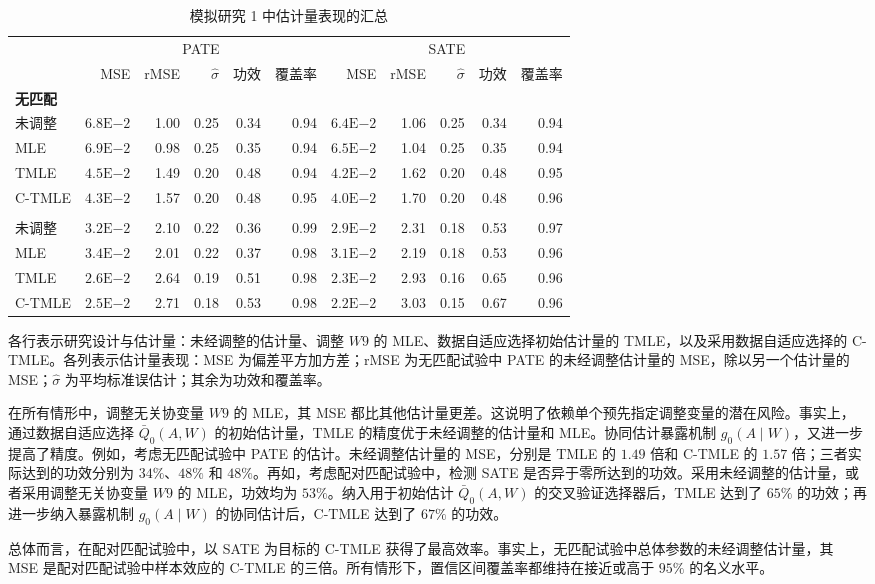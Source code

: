 \begin{table}[htbp]
 \centering
 \caption{模拟研究 1 中估计量表现的汇总}
 \label{tab:ch13-study1}
 \begingroup
 \small
 \setlength{\tabcolsep}{3pt}
 \renewcommand{\arraystretch}{1.16}
 \begin{tabular}{lrrrrrrrrrr}
  \toprule
  &\multicolumn{5}{c}{PATE}&\multicolumn{5}{c}{SATE}\\
  \cmidrule(lr){2-6}\cmidrule(lr){7-11}
  &MSE&rMSE&$\hat\sigma$&功效&覆盖率&MSE&rMSE&$\hat\sigma$&功效&覆盖率\\
  \midrule
  \multicolumn{11}{l}{\textbf{无匹配}}\\
  未调整&$6.8\mathrm E{-2}$&1.00&0.25&0.34&0.94&$6.4\mathrm E{-2}$&1.06&0.25&0.34&0.94\\
  MLE&$6.9\mathrm E{-2}$&0.98&0.25&0.35&0.94&$6.5\mathrm E{-2}$&1.04&0.25&0.35&0.94\\
  TMLE&$4.5\mathrm E{-2}$&1.49&0.20&0.48&0.94&$4.2\mathrm E{-2}$&1.62&0.20&0.48&0.95\\
  C-TMLE&$4.3\mathrm E{-2}$&1.57&0.20&0.48&0.95&$4.0\mathrm E{-2}$&1.70&0.20&0.48&0.96\\
  \addlinespace[.3em]
  \multicolumn{11}{l}{\textbf{有匹配}}\\
  未调整&$3.2\mathrm E{-2}$&2.10&0.22&0.36&0.99&$2.9\mathrm E{-2}$&2.31&0.18&0.53&0.97\\
  MLE&$3.4\mathrm E{-2}$&2.01&0.22&0.37&0.98&$3.1\mathrm E{-2}$&2.19&0.18&0.53&0.96\\
  TMLE&$2.6\mathrm E{-2}$&2.64&0.19&0.51&0.98&$2.3\mathrm E{-2}$&2.93&0.16&0.65&0.96\\
  C-TMLE&$2.5\mathrm E{-2}$&2.71&0.18&0.53&0.98&$2.2\mathrm E{-2}$&3.03&0.15&0.67&0.96\\
  \bottomrule
 \end{tabular}
 \endgroup
 \par\smallskip
 \begin{minipage}{\linewidth}\footnotesize
 各行表示研究设计与估计量：未经调整的估计量、调整 $W9$ 的 MLE、数据自适应选择初始估计量的 TMLE，以及采用数据自适应选择的 C-TMLE。各列表示估计量表现：MSE 为偏差平方加方差；rMSE 为无匹配试验中 PATE 的未经调整估计量的 MSE，除以另一个估计量的 MSE；$\hat\sigma$ 为平均标准误估计；其余为功效和覆盖率。
 \end{minipage}
\end{table}

在所有情形中，调整无关协变量 $W9$ 的 MLE，其 MSE 都比其他估计量更差。这说明了依赖单个预先指定调整变量的潜在风险。事实上，通过数据自适应选择 $\bar Q_0(A,W)$ 的初始估计量，TMLE 的精度优于未经调整的估计量和 MLE。协同估计暴露机制 $g_0(A\mid W)$，又进一步提高了精度。例如，考虑无匹配试验中 PATE 的估计。未经调整估计量的 MSE，分别是 TMLE 的 $1.49$ 倍和 C-TMLE 的 $1.57$ 倍；三者实际达到的功效分别为 $34\%$、$48\%$ 和 $48\%$。再如，考虑配对匹配试验中，检测 SATE 是否异于零所达到的功效。采用未经调整的估计量，或者采用调整无关协变量 $W9$ 的 MLE，功效均为 $53\%$。纳入用于初始估计 $\bar Q_0(A,W)$ 的交叉验证选择器后，TMLE 达到了 $65\%$ 的功效；再进一步纳入暴露机制 $g_0(A\mid W)$ 的协同估计后，C-TMLE 达到了 $67\%$ 的功效。

总体而言，在配对匹配试验中，以 SATE 为目标的 C-TMLE 获得了最高效率。事实上，无匹配试验中总体参数的未经调整估计量，其 MSE 是配对匹配试验中样本效应的 C-TMLE 的三倍。所有情形下，置信区间覆盖率都维持在接近或高于 $95\%$ 的名义水平。
\FloatBarrier

